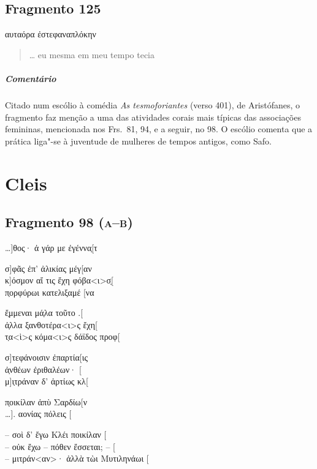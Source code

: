 \pagebreak
\section{Fragmento 125}

\begin{gkverse}
\dagger{}αυταόρα\dagger{} ἐστεφαναπλόκην
\end{gkverse}

\begin{verse}
\ldots{} eu mesma em meu tempo tecia 
\end{verse}

{\paragraph{Comentário} Citado num escólio à comédia \textit{As tesmoforiantes} (verso 401), de Aristófanes, o fragmento faz menção a uma das atividades corais mais típicas das associações femininas, mencionada nos Frs.~81, 94, e a seguir, no 98. O escólio comenta que a prática liga"-se à juventude de mulheres de tempos antigos, como Safo.}



\chapter{Cleis}

\section{Fragmento 98 (\textsc{a--b})}

\begin{gkverse}
\ldots{}]θος· ἀ γάρ με ἐγέννα̣[τ

σ]φᾶς ἐπ’ ἀλικίας μέγ[αν\\
κ]όσμον αἴ τις ἔχη φόβα<ι>σ̣[\\
π̣ορφύρωι κατελιξαμέ [να

ἔ̣μμεναι μά̣λα τοῦτο .[\\
ἀ̣λλα ξανθοτέρα<ι>ς ἔχη[\\
τ̣α<ὶ>ς κόμα<ι>ς δάϊδος προφ[

σ]τεφάνοισιν ἐπαρτία[ις\\
ἀ̣νθέων ἐριθαλέων· [ \\
μ]ι̣τράναν δ’ ἀρτίως κλ[

π̣οικίλαν ἀπὺ Σαρδίω[ν\\
\ldots{}]. αονίας πόλ{ε}ις [

\ast\quad\ast\quad\ast

-- σοὶ δ’ ἔγω Κλέι ποικίλαν [\\
-- οὐκ ἔχω -- πόθεν ἔσσεται; -- [\\
-- μιτράν<αν>· ἀλλὰ τὼι Μυτιληνάωι [
\end{gkverse}

